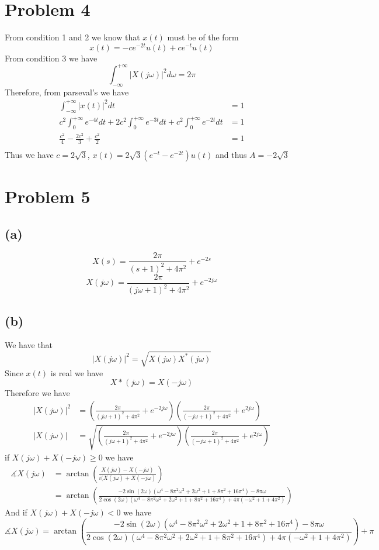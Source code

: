 \documentclass[12pt]{article}
\begin{document}
\section*{Problem 4}
From condition 1 and 2 we know that 
$x(t)$ must be of the form 
$$x(t)=-ce^{-2t}u(t)+ce^{-t}u(t)$$
From condition 3 we have
$$\int_{-\infty}^{+\infty}|X(j\omega)|^2d\omega=2\pi$$
Therefore, from parseval's we have
\begin{align*}
\int_{-\infty}^{+\infty}|x(t)|^2dt&=1\\
c^2\int_{0}^{+\infty}e^{-4t}dt+2c^2\int_{0}^{+\infty}e^{-3t}dt+c^2\int_{0}^{+\infty}e^{-2t}dt&=1\\
\frac{c^2}{4}-\frac{2c^2}{3}+\frac{c^2}{2}&=1\\
\end{align*}
Thus we have $c=2\sqrt{3}$, $x(t)=2\sqrt{3}(e^{-t}-e^{-2t})u(t)$ and thus $A=-2\sqrt{3}$
\section*{Problem 5}
\subsection*{(a)}
$$X(s)=\frac{2\pi}{(s+1)^2+4\pi^2}+e^{-2s}$$
$$X(j\omega)=\frac{2\pi}{(j\omega+1)^2+4\pi^2}+e^{-2j\omega}$$
\subsection*{(b)}
We have that
$$|X(j\omega)|^2=\sqrt{X(j\omega)X^*(j\omega)}$$
Since $x(t)$ is real we have
$$X*(j\omega)=X(-j\omega)$$
Therefore we have
\begin{align*}
|X(j\omega)|^2&=\left(\frac{2\pi}{(j\omega+1)^2+4\pi^2}+e^{-2j\omega}\right)\left(\frac{2\pi}{(-j\omega+1)^2+4\pi^2}+e^{2j\omega}\right)\\
|X(j\omega)|&=\sqrt{\left(\frac{2\pi}{(j\omega+1)^2+4\pi^2}+e^{-2j\omega}\right)\left(\frac{2\pi}{(-j\omega+1)^2+4\pi^2}+e^{2j\omega}\right)}
\end{align*}
if $X(j\omega)+X(-j\omega)\geq0$ we have
\begin{align*}
\measuredangle X(j\omega)&=\arctan\left( \frac{X(j\omega)-X(-j\omega)}{i(X(j\omega)+X(-j\omega)}\right)\\
&=\arctan\left(\frac{-2\sin(2\omega)(\omega^{4} - 8 \pi^{2} \omega^{2} + 2 \omega^{2} + 1 + 8 \pi^{2} + 16 \pi^{4})-8 \pi \omega}{2\cos(2\omega)(\omega^{4} - 8 \pi^{2} \omega^{2} + 2 \omega^{2} + 1 + 8 \pi^{2} + 16 \pi^{4})+4 \pi \left(- \omega^{2} + 1 + 4 \pi^{2}\right)}\right)
\end{align*}
And if $X(j\omega)+X(-j\omega)<0$ we have
$$
\measuredangle X(j\omega)=\arctan\left(\frac{-2\sin(2\omega)(\omega^{4} - 8 \pi^{2} \omega^{2} + 2 \omega^{2} + 1 + 8 \pi^{2} + 16 \pi^{4})-8 \pi \omega}{2\cos(2\omega)(\omega^{4} - 8 \pi^{2} \omega^{2} + 2 \omega^{2} + 1 + 8 \pi^{2} + 16 \pi^{4})+4 \pi \left(- \omega^{2} + 1 + 4 \pi^{2}\right)}\right)+\pi$$
\end{document}
